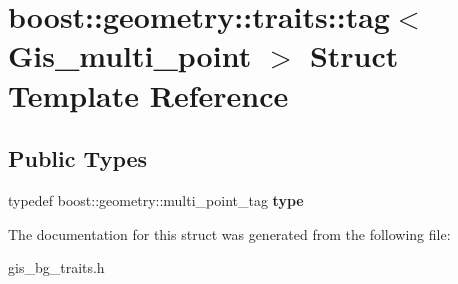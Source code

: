 \hypertarget{structboost_1_1geometry_1_1traits_1_1tag_3_01Gis__multi__point_01_4}{}\section{boost\+:\+:geometry\+:\+:traits\+:\+:tag$<$ Gis\+\_\+multi\+\_\+point $>$ Struct Template Reference}
\label{structboost_1_1geometry_1_1traits_1_1tag_3_01Gis__multi__point_01_4}
\subsection*{Public Types}
\begin{DoxyCompactItemize}
\item 
\mbox{\label{structboost_1_1geometry_1_1traits_1_1tag_3_01Gis__multi__point_01_4_af3a2debc276416f64b9450a68636369a}} 
typedef boost\+::geometry\+::multi\+\_\+point\+\_\+tag {\bfseries type}
\end{DoxyCompactItemize}


The documentation for this struct was generated from the following file\+:\begin{DoxyCompactItemize}
\item 
gis\+\_\+bg\+\_\+traits.\+h\end{DoxyCompactItemize}
